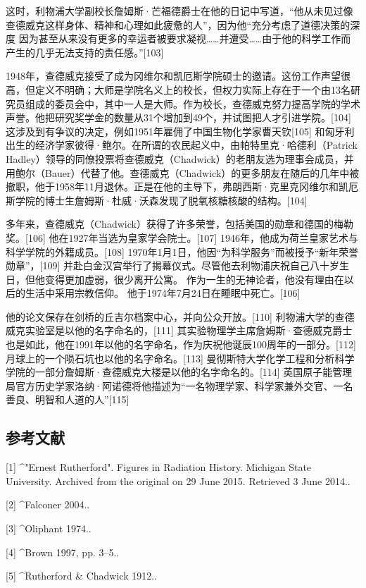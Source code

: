 这时，利物浦大学副校长詹姆斯·芒福德爵士在他的日记中写道，“他从未见过像查德威克这样身体、精神和心理如此疲惫的人”，因为他“充分考虑了道德决策的深度 因为甚至从来没有更多的幸运者被要求凝视……并遭受……由于他的科学工作而产生的几乎无法支持的责任感。”[103]

1948年，查德威克接受了成为冈维尔和凯厄斯学院硕士的邀请。这份工作声望很高，但定义不明确；大师是学院名义上的校长，但权力实际上存在于一个由13名研究员组成的委员会中，其中一人是大师。作为校长，查德威克努力提高学院的学术声誉。他把研究奖学金的数量从31个增加到49个，并试图把人才引进学院。[104]这涉及到有争议的决定，例如1951年雇佣了中国生物化学家曹天钦[105] 和匈牙利出生的经济学家彼得·鲍尔。在所谓的农民起义中，由帕特里克·哈德利（Patrick Hadley）领导的同僚投票将查德威克（Chadwick）的老朋友选为理事会成员，并用鲍尔（Bauer）代替了他。查德威克（Chadwick）的更多朋友在随后的几年中被撤职，他于1958年11月退休。正是在他的主导下，弗朗西斯·克里克冈维尔和凯厄斯学院的博士生詹姆斯·杜威·沃森发现了脱氧核糖核酸的结构。[104]

多年来，查德威克（Chadwick）获得了许多荣誉，包括美国的勋章和德国的梅勒奖。[106] 他在1927年当选为皇家学会院士。[107] 1946年，他成为荷兰皇家艺术与科学学院的外籍成员。[108] 1970年1月1日，他因“为科学服务”而被授予“新年荣誉勋章”，[109] 并赴白金汉宫举行了揭幕仪式。尽管他去利物浦庆祝自己八十岁生日，但他变得更加虚弱，很少离开公寓。 作为一生的无神论者，他没有理由在以后的生活中采用宗教信仰。 他于1974年7月24日在睡眠中死亡。[106]

他的论文保存在剑桥的丘吉尔档案中心，并向公众开放。[110] 利物浦大学的查德威克实验室是以他的名字命名的，[111] 其实验物理学主席詹姆斯·查德威克爵士也是如此，他在1991年以他的名字命名，作为庆祝他诞辰100周年的一部分。[112] 月球上的一个陨石坑也以他的名字命名。[113] 曼彻斯特大学化学工程和分析科学学院的一部分詹姆斯·查德威克大楼是以他的名字命名的。[114] 英国原子能管理局官方历史学家洛纳·阿诺德将他描述为“一名物理学家、科学家兼外交官、一名善良、明智和人道的人”[115]

\subsection{参考文献}
[1]
^"Ernest Rutherford". Figures in Radiation History. Michigan State University. Archived from the original on 29 June 2015. Retrieved 3 June 2014..

[2]
^Falconer 2004..

[3]
^Oliphant 1974..

[4]
^Brown 1997, pp. 3–5..

[5]
^Rutherford & Chadwick 1912..

